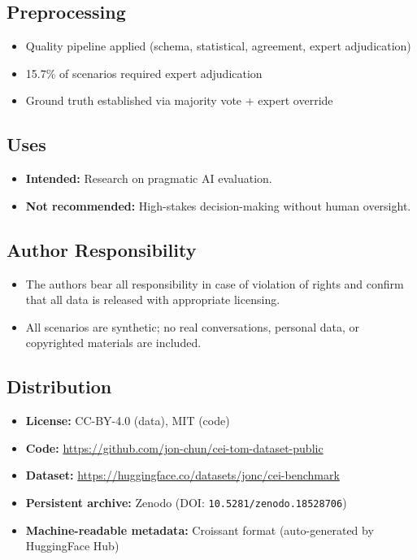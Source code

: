 \documentclass[twoside,11pt]{article}
\begin{document}
\subsection{Preprocessing}
\begin{itemize}[leftmargin=*,noitemsep]
    \item Quality pipeline applied (schema, statistical, agreement, expert adjudication)
    \item 15.7\% of scenarios required expert adjudication
    \item Ground truth established via majority vote + expert override
\end{itemize}

\subsection{Uses}
\begin{itemize}[leftmargin=*,noitemsep]
    \item \textbf{Intended:} Research on pragmatic AI evaluation.
    \item \textbf{Not recommended:} High-stakes decision-making without human oversight.
\end{itemize}

\subsection{Author Responsibility}
\begin{itemize}[leftmargin=*,noitemsep]
    \item The authors bear all responsibility in case of violation of rights and confirm that all data is released with appropriate licensing.
    \item All scenarios are synthetic; no real conversations, personal data, or copyrighted materials are included.
\end{itemize}

\subsection{Distribution}
\begin{itemize}[leftmargin=*,noitemsep]
    \item \textbf{License:} CC-BY-4.0 (data), MIT (code)
    \item \textbf{Code:} \url{https://github.com/jon-chun/cei-tom-dataset-public}
    \item \textbf{Dataset:} \url{https://huggingface.co/datasets/jonc/cei-benchmark}
    \item \textbf{Persistent archive:} Zenodo (DOI: \texttt{10.5281/zenodo.18528706})
    \item \textbf{Machine-readable metadata:} Croissant format (auto-generated by HuggingFace Hub)
\end{itemize}
\end{document}
